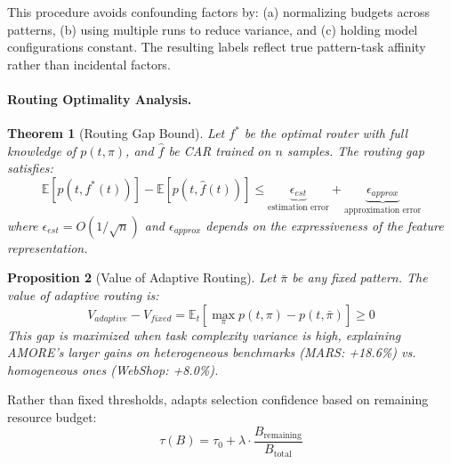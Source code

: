 \documentclass{article}
\theoremstyle{plain}
\newtheorem{theorem}{Theorem}[section]
\newtheorem{proposition}[theorem]{Proposition}
\theoremstyle{definition}
\theoremstyle{remark}
\begin{document}
This procedure avoids confounding factors by: (a) normalizing budgets across patterns, (b) using multiple runs to reduce variance, and (c) holding model configurations constant. The resulting labels reflect true pattern-task affinity rather than incidental factors.

\paragraph{Routing Optimality Analysis.}

\begin{theorem}[Routing Gap Bound]
	\label{thm:routing-gap}
	Let $f^*$ be the optimal router with full knowledge of $p(t, \pi)$,
	and $\hat{f}$ be CAR trained on $n$ samples. The routing gap satisfies:
	\[
	\mathbb{E}[p(t, f^*(t))] - \mathbb{E}[p(t, \hat{f}(t))] \leq
	\underbrace{\epsilon_{est}}_{\text{estimation error}} +
	\underbrace{\epsilon_{approx}}_{\text{approximation error}}
	\]
	where $\epsilon_{est} = O(1/\sqrt{n})$ and $\epsilon_{approx}$
	depends on the expressiveness of the feature representation.
\end{theorem}

\begin{proposition}[Value of Adaptive Routing]
	\label{prop:value}
	Let $\bar{\pi}$ be any fixed pattern. The value of adaptive
	routing is:
	\[
	V_{adaptive} - V_{fixed} = \mathbb{E}_t\left[\max_\pi p(t,\pi)
	- p(t, \bar{\pi})\right] \geq 0
	\]
	This gap is maximized when task complexity variance is high,
	explaining AMORE's larger gains on heterogeneous benchmarks
	(MARS: +18.6\%) vs. homogeneous ones (WebShop: +8.0\%).
\end{proposition}



Rather than fixed thresholds, \car{} adapts selection confidence based on remaining resource budget:
\begin{equation}
	\tau(B) = \tau_0 + \lambda \cdot \frac{B_{\text{remaining}}}{B_{\text{total}}}
\end{equation}
\end{document}
